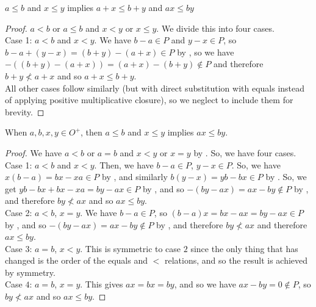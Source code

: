 \begin{theorem}\label{add-compatible-leq}
$a \le b$ and $x \le y$ implies $a+x \le b+y$ and $ax \le by$
\end{theorem}
\begin{proof}
$a < b$ or $a\le b$ and $x < y$ or $x \le y$. We divide this into four cases. \\

Case 1: $a < b$ and $x < y$. We have $b-a \in P$ and $y-x \in P$, so $b-a + (y-x) = (b+y)-(a+x) \in P$ by , so we have $-((b+y)-(a+x)) = (a+x) - (b+y) \notin P$ and therefore $b+y \nless a+x$ and so $a+x \le b+y$. \\

All other cases follow similarly (but with direct substitution with equals instead of applying positive multiplicative closure), so we neglect to include them for brevity.
\end{proof}

\begin{theorem}\label{pos-mult-compatible-leq}
When $a, b, x, y \in O^+$, then $a \le b$ and $x \le y$ implies $ax \le by$.
\end{theorem}
\begin{proof}
We have $a < b$ or $a = b$ and $x < y$ or $x=y$ by . So, we have four cases. \\

Case 1: $a<b$ and $x<y$. Then, we have $b-a \in P$, $y-x \in P$. So, we have $x(b-a) = bx-xa \in P$ by , and similarly $b(y-x) = yb - bx \in P$ by . So, we get $yb-bx + bx - xa = by - ax \in P$ by , and so $-(by-ax) = ax-by \notin P$ by , and therefore $by \nless ax$ and so $ax \le by$. \\

Case 2: $a < b$, $x=y$. We have $b-a \in P$, so $(b-a)x = bx - ax = by - ax \in P$ by , and so $-(by-ax) = ax-by \notin P$ by , and therefore $by \nless ax$ and therefore $ax \le by$. \\

Case $3$: $a = b$, $x < y$. This is symmetric to case $2$ since the only thing that has changed is the order of the equals and $<$ relations, and so the result is achieved by symmetry. \\

Case $4$: $a = b$, $x =y$. This gives $ax = bx = by$, and so we have $ax - by = 0 \notin P$, so $by \nless ax$ and so $ax \le by$. 
\end{proof}

